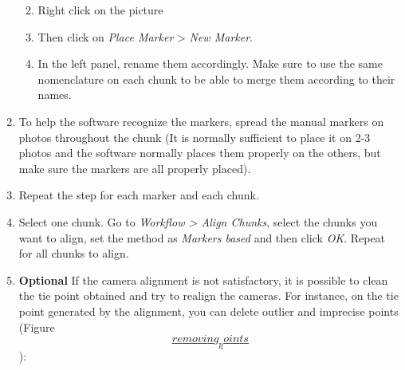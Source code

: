 \documentclass[
]{book}
\theoremstyle{definition}
\theoremstyle{definition}
\theoremstyle{definition}
\theoremstyle{definition}
\theoremstyle{remark}
\begin{document}
\begin{enumerate}
  \begin{enumerate}
  \def\labelenumii{\arabic{enumii}.}
  \item
    Right click on the picture
  \item
    Then click on \emph{Place Marker} \textgreater{} \emph{New Marker}.
  \item
    In the left panel, rename them accordingly. Make sure to use the
    same nomenclature on each chunk to be able to merge them
    according to their names.
  \end{enumerate}
\item
  To help the software recognize the markers, spread the manual
  markers on photos throughout the chunk (It is normally sufficient to
  place it on 2-3 photos and the software normally places them
  properly on the others, but make sure the markers are all properly
  placed).
\item
  Repeat the step for each marker and each chunk.
\item
  Select one chunk. Go to \emph{Workflow \textgreater{} Align Chunks}, select the
  chunks you want to align, set the method as \emph{Markers based} and then
  click \emph{OK}. Repeat for all chunks to align.
\item
  \textbf{Optional} If the camera alignment is not satisfactory, it is
  possible to clean the tie point obtained and try to realign the
  cameras. For instance, on the tie point generated by the alignment,
  you can delete outlier and imprecise points (Figure
  \protect\hyperlink{removing_points}{\[removing_points\]}):


\end{enumerate}
\end{document}
